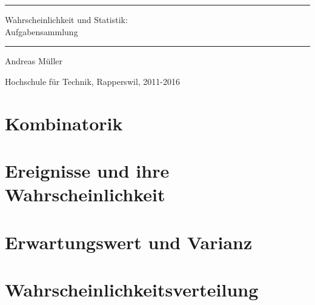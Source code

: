 \documentclass[a4paper,12pt]{book}
\begin{document}
\pagestyle{fancy}
\rhead{}
\frontmatter
\newcommand\HRule{\noindent\rule{\linewidth}{1.5pt}}
\begin{titlepage}
\HRule
\vspace*{2pt}
\begin{flushright}
{\Huge
Wahrscheinlichkeit und Statistik:\\
\bigskip
Aufgabensammlung}
\end{flushright}
\HRule
\begin{flushright}
\vspace{30pt}
\LARGE
Andreas Müller
\end{flushright}
\begin{center}
Hochschule für Technik, Rapperswil, 2011-2016
\end{center}
\end{titlepage}
\hypersetup{
        linktoc=all,
        linkcolor=blue
}
\tableofcontents
\newenvironment{beispiel}[1][Beispiel]{%
\begin{proof}[#1]%
\renewcommand{\qedsymbol}{$\bigcirc$}
}{\end{proof}}
\mainmatter

\openthemaindex
{}

\chapter{Kombinatorik}

\chapter{Ereignisse und ihre Wahrscheinlichkeit}

%
\chapter{Erwartungswert und Varianz}

\chapter{Wahrscheinlichkeitsverteilung}

\end{document}

